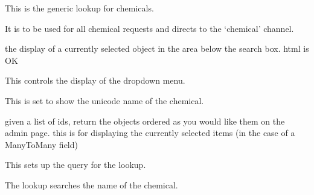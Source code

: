 \documentclass[letterpaper,10pt,english]{sphinxmanual}
\begin{document}

\begin{fulllineitems}
\label{api:experimentdb.reagents.lookups.ChemicalLookup}
This is the generic lookup for chemicals.

It is to be used for all chemical requests and directs to the `chemical' channel.

\begin{fulllineitems}
\label{api:experimentdb.reagents.lookups.ChemicalLookup.format_item}
the display of a currently selected object in the area below the search box. html is OK

\end{fulllineitems}


\begin{fulllineitems}
\label{api:experimentdb.reagents.lookups.ChemicalLookup.format_result}
This controls the display of the dropdown menu.

This is set to show the unicode name of the chemical.

\end{fulllineitems}


\begin{fulllineitems}
\label{api:experimentdb.reagents.lookups.ChemicalLookup.get_objects}
given a list of ids, return the objects ordered as you would like them on the admin page.
this is for displaying the currently selected items (in the case of a ManyToMany field)

\end{fulllineitems}


\begin{fulllineitems}
\label{api:experimentdb.reagents.lookups.ChemicalLookup.get_query}
This sets up the query for the lookup.

The lookup searches the name of the chemical.

\end{fulllineitems}


\end{fulllineitems}
\end{document}
